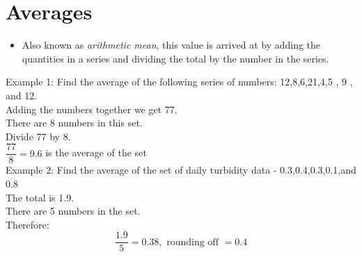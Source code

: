 \section{Averages}
\begin{itemize}
\item Also known as \emph{arithmetic mean}, this value is arrived at by adding the quantities in a series and dividing the total by the number in the series.
\end{itemize}
Example 1: Find the average of the following series of numbers: 12,8,6,21,4,5 , 9 , and 12.\\
Adding the numbers together we get 77.\\
There are 8 numbers in this set.\\
Divide 77 by 8.\\

$\dfrac{77}{8}=9.6$ is the average of the set\\

Example 2:  Find the average of the set of daily turbidity data - 0.3,0.4,0.3,0.1,and 0.8\\
The total is 1.9.\\
There are 5 numbers in the set.\\
Therefore:
$$
\dfrac{1.9}{5}=0.38, \text { rounding off }=0.4
$$








